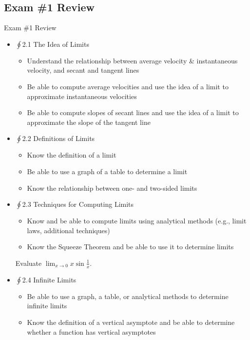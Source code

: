 \documentclass[cal1spr16Lectures.tex]{subfiles}
\begin{document}
\subsection{Exam \#1 Review}

\begin{frame}[allowframebreaks]{Exam \#1 Review}\footnotesize
\begin{itemize}
\item $\oint$2.1  The Idea of Limits
	\begin{itemize}\footnotesize
	\item Understand the relationship between average velocity \& instantaneous velocity, and secant and tangent lines
	\item Be able to compute average velocities and use the idea of a limit to approximate instantaneous velocities
	\item Be able to compute slopes of secant lines and use the idea of a limit to approximate the slope of the tangent line
	\end{itemize}
\framebreak	
\item $\oint$2.2 Definitions of Limits
	\begin{itemize}\footnotesize
	\item Know the definition of a limit
	\item Be able to use a graph of a table to determine a limit
	\item Know the relationship between one- and two-sided limits
	\end{itemize}
\item $\oint$2.3 Techniques for Computing Limits
	\begin{itemize}\footnotesize
	\item Know and be able to compute limits using analytical methods (e.g., limit laws, additional techniques)
	\item Know the Squeeze Theorem and be able to use it to determine limits
	\end{itemize}
\framebreak
\begin{ex} Evaluate $\displaystyle\lim_{x\to 0}x\sin{\frac{1}{x}}$. \end{ex}	
\item $\oint$2.4 Infinite Limits
	\begin{itemize}\footnotesize
	\item Be able to use a graph, a table, or analytical methods to determine infinite limits
	\item Know the definition of a vertical asymptote  and be able to determine whether a function has vertical asymptotes 

\end{itemize}
\end{itemize}
\end{frame}
\end{document}
